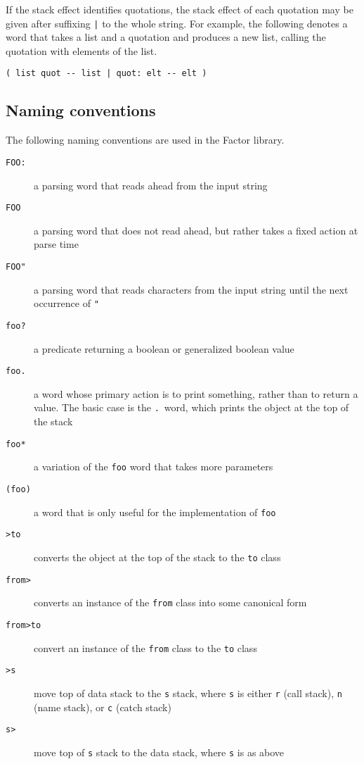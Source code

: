\documentclass{report}
\begin{document}
If the stack effect identifies quotations, the stack effect of each quotation may be given after suffixing \texttt{|} to the whole string. For example, the following denotes a word that takes a list and a quotation and produces a new list, calling the quotation with elements of the list.
\begin{verbatim}
( list quot -- list | quot: elt -- elt )
\end{verbatim}

\subsection{Naming conventions}

The following naming conventions are used in the Factor library.

\begin{description}
\item[\texttt{FOO:}] a parsing word that reads ahead from the input string
\item[\texttt{FOO}] a parsing word that does not read ahead, but rather takes a fixed action at parse time
\item[\texttt{FOO"}] a parsing word that reads characters from the input string until the next occurrence of \texttt{"}
\item[\texttt{foo?}] a predicate returning a boolean or generalized boolean value
\item[\texttt{foo.}] a word whose primary action is to print something, rather than to return a value. The basic case is the \texttt{.}~word, which prints the object at the top of the stack
\item[\texttt{foo*}] a variation of the \texttt{foo} word that takes more parameters
\item[\texttt{(foo)}] a word that is only useful for the implementation of \texttt{foo}
\item[\texttt{>to}] converts the object at the top of the stack to the \texttt{to} class
\item[\texttt{from>}] converts an instance of the \texttt{from} class into some canonical form
\item[\texttt{from>to}] convert an instance of the \texttt{from} class to the \texttt{to} class
\item[\texttt{>s}] move top of data stack to the \texttt{s} stack, where \texttt{s} is either \texttt{r} (call stack), \texttt{n} (name stack), or \texttt{c} (catch stack)
\item[\texttt{s>}] move top of \texttt{s} stack to the data stack, where \texttt{s} is as above

\end{description}
\end{document}
